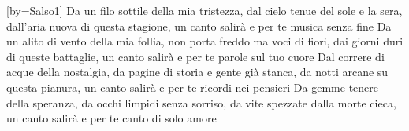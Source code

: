 [by={Salso1}]
\beginverse
Da un filo sottile della mia tristezza,
dal cielo tenue del sole e la sera,
dall'aria nuova di questa stagione,
un canto salirà e per te
musica senza fine
\endverse \beginverse
Da un alito di vento della mia follia,
non porta freddo ma voci di fiori,
dai giorni duri di queste battaglie,
un canto salirà e per te
parole sul tuo cuore
\endverse \beginverse
Dal correre di acque della nostalgia,
da pagine di storia e gente già stanca,
da notti arcane su questa pianura,
un canto salirà e per te
ricordi nei pensieri
\endverse \beginverse
Da gemme tenere della speranza,
da occhi limpidi senza sorriso,
da vite spezzate dalla morte cieca,
un canto salirà e per te
canto di solo amore
\endverse
\endsong
